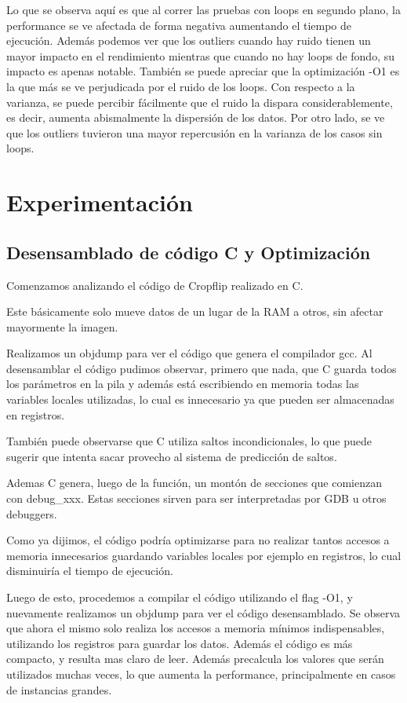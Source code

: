 \documentclass[a4paper]{article}
\begin{document}
Lo que se observa aquí es que al correr las pruebas con loops en segundo plano, la performance se ve afectada de forma negativa aumentando el tiempo de ejecución. Además podemos ver que los outliers cuando hay ruido tienen un mayor impacto en el rendimiento mientras que cuando no hay loops de fondo, su impacto es apenas notable. También se puede apreciar que la optimización -O1 es la que más se ve perjudicada por el ruido de los loops. Con respecto a la varianza, se puede percibir fácilmente que el ruido la dispara considerablemente, es decir, aumenta abismalmente la dispersión de los datos. Por otro lado, se ve que los outliers tuvieron una mayor repercusión en la varianza de los casos sin loops.

\newpage

\section{Experimentación}

\subsection{Desensamblado de código C y Optimización}

Comenzamos analizando el código de Cropflip realizado en C.

Este básicamente solo mueve datos de un lugar de la RAM a otros, sin afectar mayormente la imagen.

Realizamos un objdump para ver el código que genera el compilador gcc. Al desensamblar el código pudimos observar, primero que nada, que C guarda todos los parámetros en la pila y además está escribiendo en memoria todas las variables locales utilizadas, lo cual es innecesario ya que pueden ser almacenadas en registros.

También puede observarse que C utiliza saltos incondicionales, lo que puede sugerir que intenta sacar provecho al sistema de predicción de saltos.

Ademas C genera, luego de la función, un montón de secciones que comienzan con debug_xxx. Estas secciones sirven para ser interpretadas por GDB u otros debuggers.

Como ya dijimos, el código podría optimizarse para no realizar tantos accesos a memoria innecesarios guardando variables locales por ejemplo en registros, lo cual disminuiría el tiempo de ejecución.

Luego de esto, procedemos a compilar el código utilizando el flag -O1, y nuevamente realizamos un objdump para ver el código desensamblado. Se observa que ahora el mismo solo realiza los accesos a memoria mínimos indispensables, utilizando los registros para guardar los datos. Además el código es más compacto, y resulta mas claro de leer. Además precalcula los valores que serán utilizados muchas veces, lo que aumenta la performance, principalmente en casos de instancias grandes.
\end{document}
